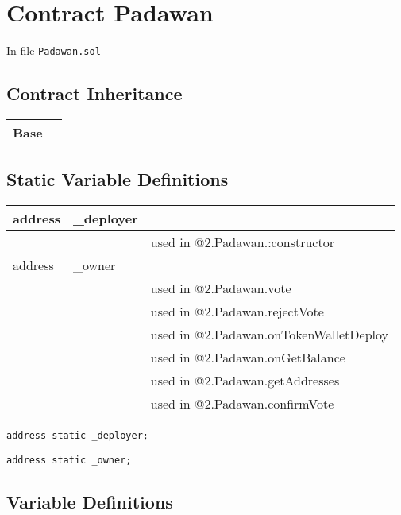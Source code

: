 
\chapter{Contract Padawan}

\minitoc

In file {\tt Padawan.sol}

\section{Contract Inheritance}


\noindent\begin{tabular}{|l|p{5cm}|}\hline
Base & \\\hline
\end{tabular}


\section{Static Variable Definitions}


\ifsoltables
\noindent\begin{tabular}{|l|l|p{5cm}|}\hline
address & \_{}deployer &  \\\hline
 & & used in @2.Padawan.:constructor\\\hline
address & \_{}owner &  \\\hline
 & & used in @2.Padawan.vote\\\hline
 & & used in @2.Padawan.rejectVote\\\hline
 & & used in @2.Padawan.onTokenWalletDeploy\\\hline
 & & used in @2.Padawan.onGetBalance\\\hline
 & & used in @2.Padawan.getAddresses\\\hline
 & & used in @2.Padawan.confirmVote\\\hline
\end{tabular}
\fi


\begin{lstlisting}[firstnumber=18]
    address static _deployer;
\end{lstlisting}

\begin{lstlisting}[firstnumber=19]
    address static _owner;
\end{lstlisting}

\section{Variable Definitions}


